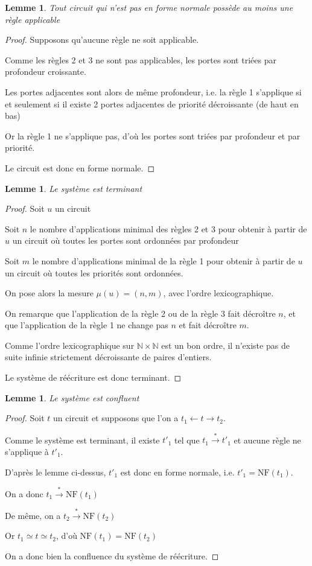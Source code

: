 \documentclass[12pt, a4paper]{article}
\newtheorem{lemma}[definition]{Lemme}
\def\N{ \mathbb N }
\def\nf{ \mathrm{NF} }
\def\clrt#1{ \overset{*}{ #1 } }
\begin{document}
\begin{lemma}
    Tout circuit qui n'est pas en forme normale possède au moins une règle applicable
\end{lemma}
\begin{proof}
    Supposons qu'aucune règle ne soit applicable.

    Comme les règles 2 et 3 ne sont pas applicables, les portes sont triées par profondeur croissante.

    Les portes adjacentes sont alors de même profondeur, i.e. la règle 1 s'applique si et seulement si il existe 2 portes adjacentes de priorité décroissante (de haut en bas)

    Or la règle 1 ne s'applique pas, d'où les portes sont triées par profondeur et par priorité.

    Le circuit est donc en forme normale.
\end{proof}

\begin{lemma}
    Le système est terminant
\end{lemma}
\begin{proof}
    Soit $u$ un circuit

    Soit $n$ le nombre d'applications minimal des règles 2 et 3 pour obtenir à partir de $u$ un circuit où toutes les portes sont ordonnées par profondeur

    Soit $m$ le nombre d'applications minimal de la règle 1 pour obtenir à partir de $u$ un circuit où toutes les priorités sont ordonnées.

    On pose alors la mesure $\mu(u) = (n,m)$, avec l'ordre lexicographique.

    On remarque que l'application de la règle 2 ou de la règle 3 fait décroître $n$, et que l'application de la règle 1 ne change pas $n$ et fait décroître $m$.

    Comme l'ordre lexicographique sur $\N \times \N$ est un bon ordre, il n'existe pas de suite infinie strictement décroissante de paires d'entiers.

    Le système de réécriture est donc terminant.
\end{proof}

\begin{lemma}
    Le système est confluent
\end{lemma}
\begin{proof}
    Soit $t$ un circuit et supposons que l'on a $t_1 \leftarrow t \rightarrow t_2$.

    Comme le système est terminant, il existe $t'_1$ tel que $t_1 \clrt{\rightarrow} t'_1$ et aucune règle ne s'applique à $t'_1$.

    D'après le lemme ci-dessus, $t'_1$ est donc en forme normale, i.e. $t'_1 = \nf(t_1)$.

    On a donc $t_1 \clrt{\rightarrow} \nf(t_1)$

    De même, on a $t_2 \clrt{\rightarrow} \nf(t_2)$

    Or $t_1 \simeq t \simeq t_2$, d'où $\nf(t_1) = \nf(t_2)$

    On a donc bien la confluence du système de réécriture.
\end{proof}
\end{document}
